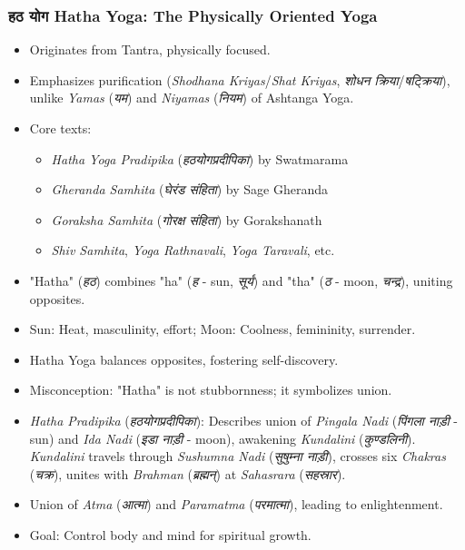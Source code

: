\begin{frame}[fragile]\frametitle{हठ योग Hatha Yoga: The Physically Oriented Yoga}
    
\begin{itemize}
    \item Originates from Tantra, physically focused.
    \item Emphasizes purification (\textit{Shodhana Kriyas}/\textit{Shat Kriyas}, \textit{शोधन क्रिया}/\textit{षट्क्रिया}), unlike \textit{Yamas} (\textit{यम}) and \textit{Niyamas} (\textit{नियम}) of Ashtanga Yoga.
    \item Core texts:
    \begin{itemize}
        \item \textit{Hatha Yoga Pradipika} (\textit{हठयोगप्रदीपिका}) by Swatmarama
        \item \textit{Gheranda Samhita} (\textit{घेरंड संहिता}) by Sage Gheranda
        \item \textit{Goraksha Samhita} (\textit{गोरक्ष संहिता}) by Gorakshanath
        \item \textit{Shiv Samhita}, \textit{Yoga Rathnavali}, \textit{Yoga Taravali}, etc.
    \end{itemize}
    \item "Hatha" (\textit{हठ}) combines "ha" (\textit{ह} - sun, \textit{सूर्य}) and "tha" (\textit{ठ} - moon, \textit{चन्द्र}), uniting opposites.
    \item Sun: Heat, masculinity, effort; Moon: Coolness, femininity, surrender.
    \item Hatha Yoga balances opposites, fostering self-discovery.
    \item Misconception: "Hatha" is not stubbornness; it symbolizes union.
    \item \textit{Hatha Pradipika} (\textit{हठयोगप्रदीपिका}): Describes union of \textit{Pingala Nadi} (\textit{पिंगला नाड़ी} - sun) and \textit{Ida Nadi} (\textit{इडा नाड़ी} - moon), awakening \textit{Kundalini} (\textit{कुण्डलिनी}).
    \textit{Kundalini} travels through \textit{Sushumna Nadi} (\textit{सुषुम्ना नाड़ी}), crosses six \textit{Chakras} (\textit{चक्र}), unites with \textit{Brahman} (\textit{ब्रह्मन्}) at \textit{Sahasrara} (\textit{सहस्रार}).
    \item Union of \textit{Atma} (\textit{आत्मा}) and \textit{Paramatma} (\textit{परमात्मा}), leading to enlightenment.
    \item Goal: Control body and mind for spiritual growth.
\end{itemize}
    
\end{frame}


